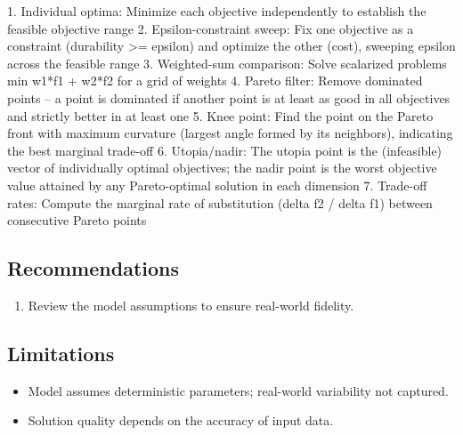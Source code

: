\documentclass[11pt, a4paper]{article}
\begin{document}
1. Individual optima: Minimize each objective independently to establish the feasible objective range
2. Epsilon-constraint sweep: Fix one objective as a constraint (durability >= epsilon) and optimize the other (cost), sweeping epsilon across the feasible range
3. Weighted-sum comparison: Solve scalarized problems min w1*f1 + w2*f2 for a grid of weights
4. Pareto filter: Remove dominated points -- a point is dominated if another point is at least as good in all objectives and strictly better in at least one
5. Knee point: Find the point on the Pareto front with maximum curvature (largest angle formed by its neighbors), indicating the best marginal trade-off
6. Utopia/nadir: The utopia point is the (infeasible) vector of individually optimal objectives; the nadir point is the worst objective value attained by any Pareto-optimal solution in each dimension
7. Trade-off rates: Compute the marginal rate of substitution (delta f2 / delta f1) between consecutive Pareto points



\subsection{Recommendations}

\begin{enumerate}
  \item Review the model assumptions to ensure real-world fidelity.
\end{enumerate}

\subsection{Limitations}

\begin{polyawarnbox}
\begin{itemize}
  \item Model assumes deterministic parameters; real-world variability not captured.
  \item Solution quality depends on the accuracy of input data.
\end{itemize}
\end{polyawarnbox}

\end{document}
